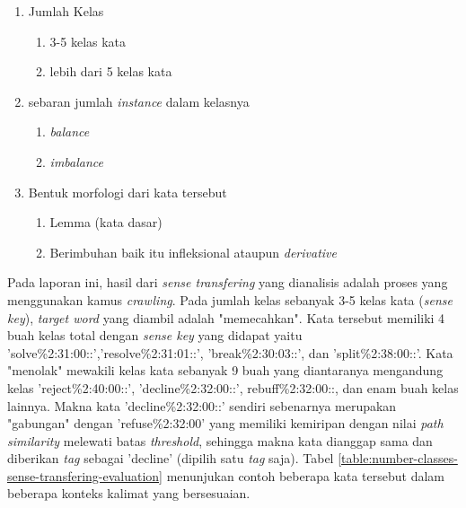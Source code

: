 \begin{enumerate}
	\item Jumlah Kelas
	\begin{enumerate}
		\item 3-5 kelas kata
		\item lebih dari 5 kelas kata
	\end{enumerate}
	\item sebaran jumlah \textit{instance} dalam kelasnya
	\begin{enumerate}
		\item \textit{balance}
		\item \textit{imbalance}
	\end{enumerate}
	\item Bentuk morfologi dari kata tersebut
	\begin{enumerate}
		\item Lemma (kata dasar)
		\item Berimbuhan baik itu infleksional ataupun \textit{derivative}
	\end{enumerate}
\end{enumerate}

Pada laporan ini, hasil dari \textit{sense transfering} yang dianalisis adalah proses yang menggunakan kamus \textit{crawling}. Pada jumlah kelas sebanyak 3-5 kelas kata (\textit{sense key}), \textit{target word} yang diambil adalah "memecahkan". Kata tersebut memiliki 4 buah kelas total dengan \textit{sense key} yang didapat yaitu 'solve\%2:31:00::','resolve\%2:31:01::', 'break\%2:30:03::', dan 'split\%2:38:00::'. Kata "menolak" mewakili kelas kata sebanyak 9 buah yang diantaranya mengandung kelas 'reject\%2:40:00::', 'decline\%2:32:00::', rebuff\%2:32:00::, dan enam buah kelas lainnya. Makna kata 'decline\%2:32:00::' sendiri sebenarnya merupakan "gabungan" dengan 'refuse\%2:32:00' yang memiliki kemiripan dengan nilai \textit{path similarity} melewati batas \textit{threshold}, sehingga makna kata dianggap sama dan diberikan \textit{tag} sebagai 'decline' (dipilih satu \textit{tag} saja). Tabel \ref{table:number-classes-sense-transfering-evaluation} menunjukan contoh beberapa kata tersebut dalam beberapa konteks kalimat yang bersesuaian.

